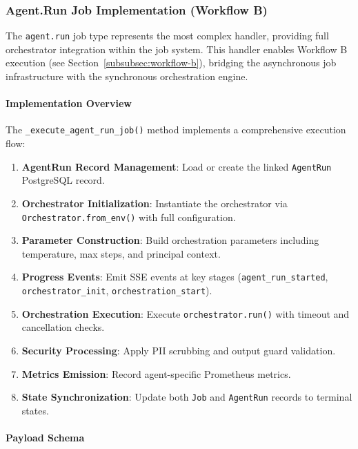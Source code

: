 \subsubsection{Agent.Run Job Implementation (Workflow B)}
\label{subsubsec:agent-run-job}

The \texttt{agent.run} job type represents the most complex handler, providing full orchestrator integration within the job system. This handler enables Workflow B execution (see Section~\ref{subsubsec:workflow-b}), bridging the asynchronous job infrastructure with the synchronous orchestration engine.

\paragraph{Implementation Overview}

The \texttt{\_execute\_agent\_run\_job()} method implements a comprehensive execution flow:

\begin{enumerate}
    \item \textbf{AgentRun Record Management}: Load or create the linked \texttt{AgentRun} PostgreSQL record.
    \item \textbf{Orchestrator Initialization}: Instantiate the orchestrator via \texttt{Orchestrator.from\_env()} with full configuration.
    \item \textbf{Parameter Construction}: Build orchestration parameters including temperature, max steps, and principal context.
    \item \textbf{Progress Events}: Emit SSE events at key stages (\texttt{agent\_run\_started}, \texttt{orchestrator\_init}, \texttt{orchestration\_start}).
    \item \textbf{Orchestration Execution}: Execute \texttt{orchestrator.run()} with timeout and cancellation checks.
    \item \textbf{Security Processing}: Apply PII scrubbing and output guard validation.
    \item \textbf{Metrics Emission}: Record agent-specific Prometheus metrics.
    \item \textbf{State Synchronization}: Update both \texttt{Job} and \texttt{AgentRun} records to terminal states.
\end{enumerate}

\paragraph{Payload Schema}

